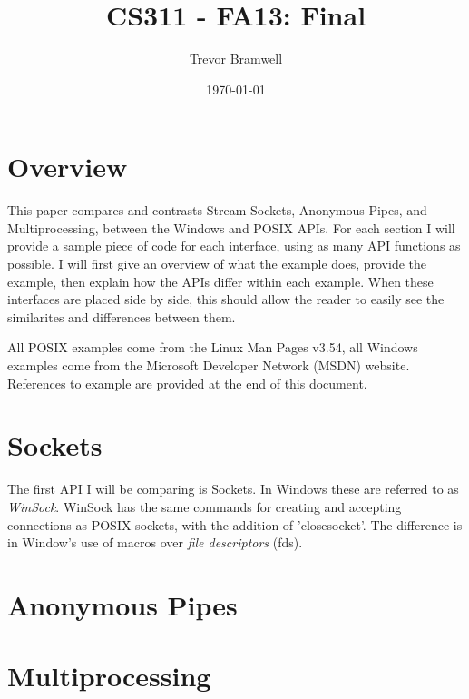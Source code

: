 \documentclass[letterpaper,10pt]{article}
\title{CS311 - FA13: Final}
\date{\today}
\author{Trevor Bramwell}
\begin{document}
\maketitle

\section{Overview}

This paper compares and contrasts Stream Sockets, Anonymous Pipes, and
Multiprocessing, between the Windows and POSIX APIs. For each section I
will provide a sample piece of code for each interface, using as many
API functions as possible. I will first give an overview of what the
example does, provide the example, then explain how the APIs differ
within each example. When these interfaces are placed side by side, this
should allow the reader to easily see the similarites and differences
between them.

All POSIX examples come from the Linux Man Pages v3.54, all Windows
examples come from the Microsoft Developer Network (MSDN) website.
References to example are provided at the end of this document.

\section{Sockets}

The first API I will be comparing is Sockets. In Windows these are
referred to as \emph{WinSock}. WinSock has the same commands for
creating and accepting connections as POSIX sockets, with the addition
of 'closesocket'. The difference is in Window's use of macros over
\emph{file descriptors} (fds).




\section{Anonymous Pipes}




\section{Multiprocessing}





\newpage
\end{document}
